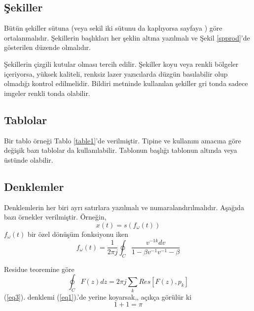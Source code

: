 \documentclass{article}
\begin{document}
 \subsection{Şekiller}
Bütün şekiller sütuna (veya sekil iki sütunu da kaplıyorsa sayfaya )
göre ortalanmalıdır. Şekillerin başlıkları her şeklin altına yazılmalı
ve Şekil \ref{spprod}'de gösterilen düzende olmalıdır.

Şekillerin çizgili kutular olması tercih edilir. Şekiller koyu veya
renkli bölgeler içeriyorsa, yüksek kaliteli, renksiz lazer yazıcılarda
düzgün basılabilir olup olmadığı kontrol edilmelidir. Bildiri metninde
kullanılan şekiller gri tonda sadece imgeler renkli tonda olabilir.


\subsection{Tablolar}

 Bir tablo örneği Tablo \ref{table1}'de
verilmiştir. Tipine ve kullanım amacına göre değişik bazı tablolar
da kullanılabilir. Tablonun başlığı tablonun altında veya üstünde
olabilir.



\subsection{Denklemler}

Denklemlerin her biri ayrı satırlara yazılmalı ve
numaralandırılmalıdır. Aşağıda bazı örnekler verilmiştir. Örneğin,
\begin{equation}
\label{eq1}
 x(t)=s(f_\omega(t))
\end{equation}
$f_\omega(t)$ bir özel dönüşüm fonksiyonu iken
\begin{equation}
f_\omega(t)=\frac{1}{2\pi j}\oint_C\frac{v^{-1k}dv}{1-\beta
v^{-1}{v^{-1}-\beta }}
\end{equation}

Residue teoremine göre
\begin{equation}
 \oint_C F(z)dz=2 \pi j \sum_k Res[F(z),p_k]
\label{eq3}
\end{equation}
(\ref{eq3}). denklemi (\ref{eq1}).'de yerine koyarsak,, açıkça
görülür ki
\begin{equation}
1 + 1 = \pi \label{eq4}
\end{equation}
\end{document}
